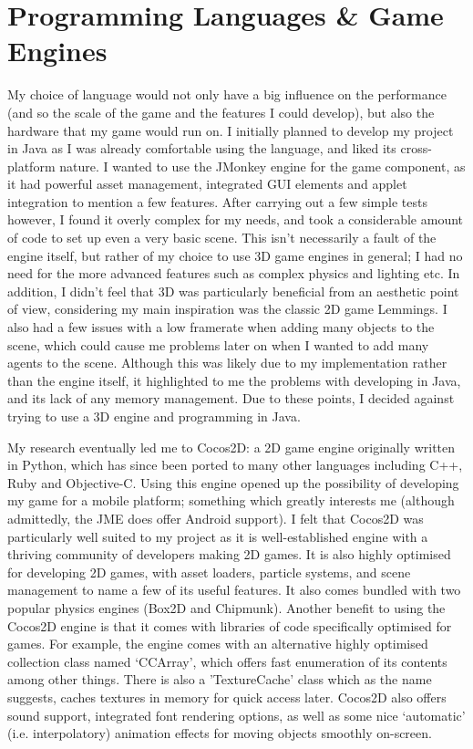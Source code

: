 \documentclass[a4paper,oneside]{report}
\begin{document}
\section{Programming Languages \& Game Engines}

My choice of language would not only have a big influence on the performance (and so the scale of the game and the features I could develop), but also the hardware that my game would run on. I initially planned to develop my project in Java as I was already comfortable using the language, and liked its cross-platform nature. I wanted to use the JMonkey engine for the game component, as it had powerful asset management, integrated GUI elements and applet integration to mention a few features. After carrying out a few simple tests however, I found it overly complex for my needs, and took a considerable amount of code to set up even a very basic scene. This isn't necessarily a fault of the engine itself, but rather of my choice to use 3D game engines in general; I had no need for the more advanced features such as complex physics and lighting etc. In addition, I didn't feel that 3D was particularly beneficial from an aesthetic point of view, considering my main inspiration was the classic 2D game Lemmings. I also had a few issues with a low framerate when adding many objects to the scene, which could cause me problems later on when I wanted to add many agents to the scene. Although this was likely due to my implementation rather than the engine itself, it highlighted to me the problems with developing in Java, and its lack of any memory management. Due to these points, I decided against trying to use a 3D engine and programming in Java.

My research eventually led me to Cocos2D: a 2D game engine originally written in Python, which has since been ported to many other languages including C++, Ruby and Objective-C. Using this engine opened up the possibility of developing my game for a mobile platform; something which greatly interests me (although admittedly, the JME does offer Android support). I felt that Cocos2D was particularly well suited to my project as it is well-established engine with a thriving community of developers making 2D games. It is also highly optimised for developing 2D games, with asset loaders, particle systems, and scene management to name a few of its useful features. It also comes bundled with two popular physics engines (Box2D and Chipmunk). Another benefit to using the Cocos2D engine is that it comes with libraries of code specifically optimised for games. For example, the engine comes with an alternative highly optimised collection class named `CCArray', which offers fast enumeration of its contents among other things. There is also a 'TextureCache' class which as the name suggests, caches textures in memory for quick access later. Cocos2D also offers sound support, integrated font rendering options, as well as some nice `automatic' (i.e. interpolatory) animation effects for moving objects smoothly on-screen. 
\end{document}
